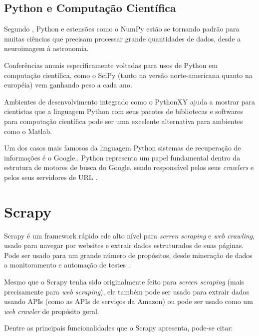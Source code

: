 \subsection{Python e Computação Científica}

Segundo \cite{python_scientific_world}, Python e estensões como o NumPy \cite{numpy} estão se tornando padrão para muitas ciências que precisam processar grande quantidades de dados, desde a neuroimagem à astronomia.

Conferências anuais especificamente voltadas para usos de Python em computação científica, como o SciPy \cite{scipy} (tanto na versão norte-americana quanto na européia) vem ganhando peso a cada ano.

Ambientes de desenvolvimento integrado como o PythonXY \cite{pythonxy} ajuda a mostrar para cientistas que a linguagem Python com seus pacotes de bibliotecas e softwares para computação científica pode ser uma excelente alternativa para ambientes como o Matlab.

Um dos casos mais famosos da linguagem Python sistemas de recuperação de informações é o Google.\cite{google}. Python representa um papel fundamental dentro da estrutura de motores de busca do Google, sendo responsável pelos seus \emph{crawlers} e pelos seus servidores de URL \cite{surveyir}.


\pagebreak
\section{Scrapy}


Scrapy é um framework rápido ede alto nível para \emph{scrren scraping} e \emph{web crawling}, usado para navegar por websites e extrair dados estruturados de suas páginas. Pode ser usado para um grande número de propósitos, desde mineração de dados a monitoramento e automação de testes \cite{scrapy}.

Mesmo que o Scrapy tenha sido originalmente feito para \emph{screen scraping} (mais precisamente para \emph{web scraping}), ele também pode ser usado para extrair dados usando APIs (como as APIs de serviços da Amazon) ou pode ser usado como um \emph{web crawler} de propósito geral.

Dentre as principais funcionalidades que o Scrapy apresenta, pode-se citar:

